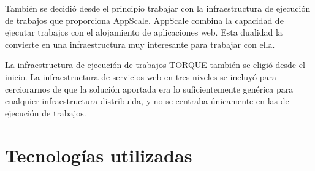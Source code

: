 También se decidió desde el principio trabajar con la infraestructura de ejecución de trabajos que proporciona AppScale. AppScale combina la capacidad de ejecutar trabajos con el alojamiento de aplicaciones web. Esta dualidad la convierte en una infraestructura muy interesante para trabajar con ella.

La infraestructura de ejecución de trabajos TORQUE también se eligió desde el inicio. La infraestructura de servicios web en tres niveles se incluyó para cerciorarnos de que la solución aportada era lo suficientemente genérica para cualquier infraestructura distribuida, y no se centraba únicamente en las de ejecución de trabajos.


\section{Tecnologías utilizadas}



